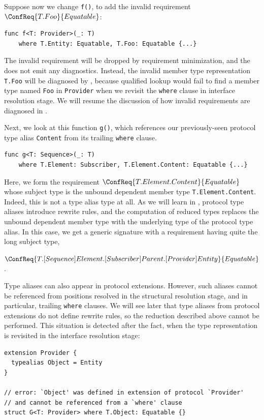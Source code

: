 \documentclass[../generics]{subfiles}
\begin{document}
Suppose now we change \texttt{f()}, to add the invalid requirement $\ConfReq{T.Foo}{Equatable}$:
\begin{Verbatim}
func f<T: Provider>(_: T)
    where T.Entity: Equatable, T.Foo: Equatable {...}
\end{Verbatim}
The invalid requirement will be dropped by requirement minimization, and the  does not emit any diagnostics. Instead, the invalid member type representation \texttt{T.Foo} will be diagnosed by , because qualified lookup would fail to find a member type named \texttt{Foo} in \texttt{Provider} when we revisit the \texttt{where} clause in interface resolution stage.  We will resume the discussion of how invalid requirements are diagnosed in .

\smallskip

Next, we look at this function \texttt{g()}, which references our previously-seen protocol type alias \texttt{Content} from its trailing \texttt{where} clause.
\begin{Verbatim}
func g<T: Sequence>(_: T)
    where T.Element: Subscriber, T.Element.Content: Equatable {...}
\end{Verbatim}
Here, we form the requirement $\ConfReq{T.Element.Content}{Equatable}$ whose subject type is the unbound dependent member type \texttt{T.Element.Content}. Indeed, this is not a type alias type at all. As we will learn in , protocol type aliases introduce rewrite rules, and the computation of reduced types replaces the unbound dependent member type with the underlying type of the protocol type alias. In this case, we get a generic signature with a requirement having quite the long subject type,
\begin{center}
$\ConfReq{T.[Sequence]Element.[Subscriber]Parent.[Provider]Entity}{Equatable}$.
\end{center}

Type aliases can also appear in protocol extensions. However, such aliases cannot be referenced from positions resolved in the structural resolution stage, and in particular, trailing \texttt{where} clauses. We will see later that type aliases from protocol extensions do not define rewrite rules, so the reduction described above cannot be performed. This situation is detected after the fact, when the type representation is revisited in the interface resolution stage:
\begin{Verbatim}
extension Provider {
  typealias Object = Entity
}

// error: `Object' was defined in extension of protocol `Provider'
// and cannot be referenced from a `where' clause
struct G<T: Provider> where T.Object: Equatable {}
\end{Verbatim}
\end{document}
